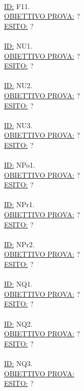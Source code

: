 \documentclass[11pt,titlepage,a4paper]{report}
\begin{document}
\\
\underline{ID:} F11.   \\
\underline{OBIETTIVO PROVA:}  ?\\
\underline{ESITO:} ?\\
\\
\underline{ID:} NU1.   \\
\underline{OBIETTIVO PROVA:}  ?\\
\underline{ESITO:} ?\\
\\
\underline{ID:} NU2.   \\
\underline{OBIETTIVO PROVA:}  ?\\
\underline{ESITO:} ?\\
\\
\underline{ID:} NU3.   \\
\underline{OBIETTIVO PROVA:}  ?\\
\underline{ESITO:} ?\\
\\
\underline{ID:} NPo1.   \\
\underline{OBIETTIVO PROVA:}  ?\\
\underline{ESITO:} ?\\
\\
\underline{ID:} NPr1.   \\
\underline{OBIETTIVO PROVA:}  ?\\
\underline{ESITO:} ?\\
\\
\underline{ID:} NPr2.   \\
\underline{OBIETTIVO PROVA:}  ?\\
\underline{ESITO:} ?\\
\\
\underline{ID:} NQ1.   \\
\underline{OBIETTIVO PROVA:}  ?\\
\underline{ESITO:} ?\\
\\
\underline{ID:} NQ2.   \\
\underline{OBIETTIVO PROVA:}  ?\\
\underline{ESITO:} ?\\
\\
\underline{ID:} NQ3.   \\
\underline{OBIETTIVO PROVA:} \\
\underline{ESITO:} ?\\
\\
\end{document}
